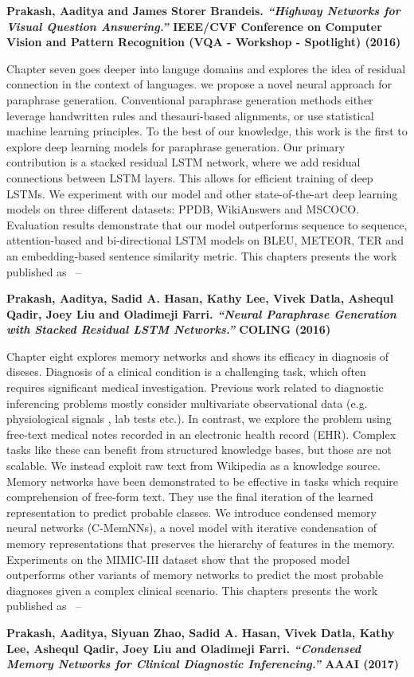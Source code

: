 \noindent\textbf{
Prakash, Aaditya and James Storer Brandeis. \textit{``Highway Networks for Visual Question Answering.''} IEEE/CVF Conference on Computer Vision and Pattern Recognition (VQA - Workshop - Spotlight) (2016)
}
\vspace{2em}

Chapter seven goes deeper into languge domains and explores the idea of residual connection in the context of languages.
we propose a novel neural approach for paraphrase generation. Conventional paraphrase generation methods either leverage handwritten rules and thesauri-based alignments, or use statistical machine learning principles. To the best of our knowledge, this work is the first to explore deep learning models for paraphrase generation. Our primary contribution is a stacked residual LSTM network, where we add residual connections between LSTM layers. This allows for efficient training of deep LSTMs. We experiment with our model and other state-of-the-art deep learning models on three different datasets: PPDB, WikiAnswers and MSCOCO. Evaluation results demonstrate that our model outperforms sequence to sequence, attention-based and bi-directional LSTM models on BLEU, METEOR, TER and an embedding-based sentence similarity metric.
This chapters presents the work published as ~\cite{Prakash2016NeuralPG}--

\noindent\textbf{
Prakash, Aaditya, Sadid A. Hasan, Kathy Lee, Vivek Datla, Ashequl Qadir, Joey Liu and Oladimeji Farri. \textit{``Neural Paraphrase Generation with Stacked Residual LSTM Networks.''} COLING (2016) 
}
\vspace{2em}


Chapter eight explores memory networks and shows its efficacy in diagnosis of diseses.
Diagnosis of a clinical condition is a challenging task, which often requires significant medical investigation. Previous work related to diagnostic inferencing problems mostly consider multivariate observational data (e.g. physiological signals , lab tests etc.). In contrast, we explore the problem using free-text medical notes recorded in an electronic health record (EHR). Complex tasks like these can benefit from structured knowledge bases, but those are not scalable. We instead exploit raw text from Wikipedia as a knowledge source. Memory networks have been demonstrated to be effective in tasks which require comprehension of free-form text. They use the final iteration of the learned representation to predict probable classes. We introduce condensed memory neural networks (C-MemNNs), a novel model with iterative condensation of memory representations that preserves the hierarchy of features in the memory. Experiments on the MIMIC-III dataset show that the proposed model outperforms other variants of memory networks to predict the most probable diagnoses given a complex clinical scenario.
This chapters presents the work published as ~\cite{Prakash2016CondensedMN}--

\noindent\textbf{
Prakash, Aaditya, Siyuan Zhao, Sadid A. Hasan, Vivek Datla, Kathy Lee, Ashequl Qadir, Joey Liu and Oladimeji Farri. \textit{``Condensed Memory Networks for Clinical Diagnostic Inferencing.''} AAAI (2017)
}
\vspace{2em}
